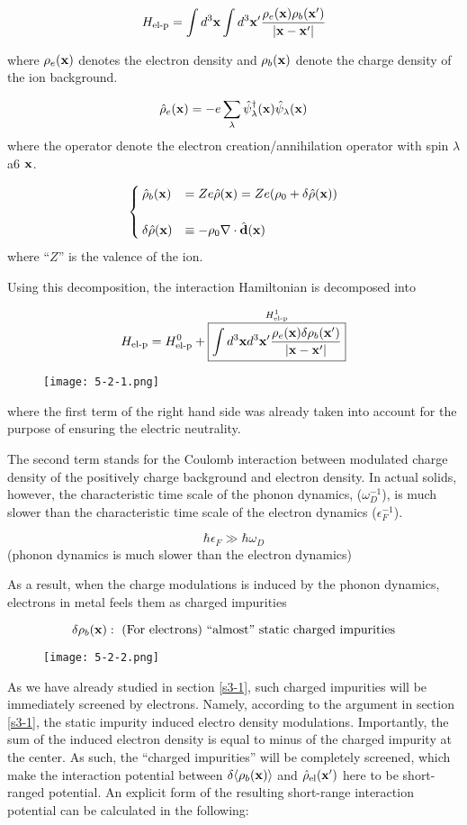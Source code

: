 \[H_{\text{el-p}}=\int d^3{\bf x}\int d^3{\bf x'}\frac{\rho_e({\bf x})\rho_b({\bf x'})}{|\bf x-x'|} \]

where $\rho_e({\bf x})$ denotes the electron density and $\rho_b({\bf x})$ denote the charge density of the ion background. 

\[\hat{\rho}_e({\bf x}) = -e\sum_\lambda\hat{\psi}_\lambda^\dagger({\bf x})\hat{\psi}_\lambda({\bf x}) \]
where the operator denote the electron creation/annihilation operator with spin $\lambda$ a6 $\bf x$. 

\[\begin{cases}
\hat{\rho}_b({\bf x}) &= Ze\hat{\rho}({\bf x}) = Ze(\rho_0+\delta\hat{\rho}({\bf x}))\\
&\\
\delta\hat{\rho}({\bf x}) &\equiv-\rho_0\nabla\cdot\hat{\bf d}({\bf x})
\end{cases}\]
where ``$Z$'' is the valence of the ion. 

Using this decomposition, the interaction Hamiltonian is decomposed into

\[H_{\text{el-p}} = H_{\text{el-p}}^0 + \overset{H_{\text{el-p}}^1}{\fbox{$\displaystyle\int d^3{\bf x}d^3{\bf x'}\displaystyle\frac{\rho_e({\bf x})\delta\rho_b({\bf x'})}{|\bf x-x'|}$}} \]
\begin{wrapfigure}{r}{6cm}
\texttt{[image: 5-2-1.png]}
\end{wrapfigure}
where the first term of the right hand side was already taken into account for the purpose of ensuring the electric neutrality. 

The second term stands for the Coulomb interaction between modulated charge density of the positively charge background and electron density. In actual solids, however, the characteristic time scale of the phonon dynamics, ($\omega_D^{-1}$), is much slower than the characteristic time scale of the electron dynamics ($\epsilon_F^{-1}$). 

\[\hbar\epsilon_F\gg\hbar\omega_D \]
(phonon dynamics is much slower than the electron dynamics)

As a result, when the charge modulations is induced by the phonon dynamics, electrons in metal feels them as  charged impurities

\[\delta\rho_b({\bf x}):\text{ (For electrons) ``almost'' static charged impurities} \]
\begin{wrapfigure}{r}{6cm}
\texttt{[image: 5-2-2.png]}
\end{wrapfigure}
As we have already studied in section \ref{s3-1}, such charged impurities will be immediately screened by electrons. Namely, according to the argument in section \ref{s3-1}, the static impurity induced electro density modulations. Importantly, the sum of the induced electron density is equal to minus of the charged impurity at the center. As such, the ``charged impurities'' will be completely screened, which make the interaction potential between $\delta\langle\rho_b(\bf x)\rangle$ and $\hat{\rho}_{\text{el}}(\bf x')$ here to be short-ranged potential. An explicit form of the resulting short-range interaction potential can be calculated in the following:

